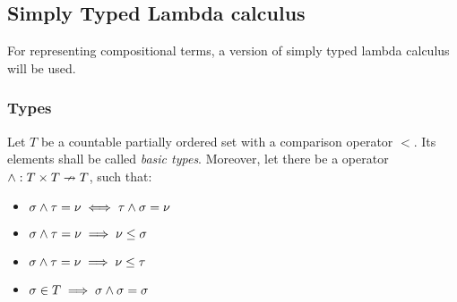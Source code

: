 \documentclass[main.tex]{subfiles}
\begin{document}
\subsection{Simply Typed Lambda calculus}

For representing compositional terms, a version of simply typed lambda calculus
will be used.

\subsubsection{Types}
\begin{defn}\label{lessmeet}
    Let $T$ be a countable partially ordered
    set with a comparison operator $\less$.
    Its elements shall be called \emph{basic types}.
    Moreover, let there be a operator $\wedge : T \times T \nrightarrow T$,
    such that:
    \begin{itemize}
        \item $\sigma \wedge \tau = \nu \iff \tau \wedge \sigma = \nu$
        \item $\sigma \wedge \tau = \nu \implies \nu \leq \sigma$
        \item $\sigma \wedge \tau = \nu \implies \nu \leq \tau$
        \item $\sigma \in T       \implies \sigma \wedge \sigma = \sigma$
    \end{itemize}
\end{defn}
\end{document}
